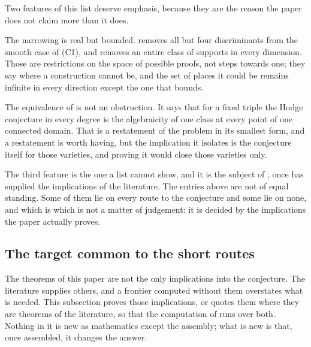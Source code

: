 \begin{remark}\label{rem:remaindershape}
Two features of this list deserve emphasis, because they are the reason the
paper does not claim more than it does.

The narrowing is real but bounded.  removes all
but four discriminants from the smooth case of (C1), and
 removes an entire class of supports in every
dimension. Those are restrictions on the space of possible proofs, not steps
towards one; they say where a construction cannot be, and the set of places it
could be remains infinite in every direction except the one that
 bounds.

The equivalence of  is not an obstruction. It says that
for a fixed triple the Hodge conjecture in every degree is the algebraicity of
one class at every point of one connected domain. That is a restatement of the
problem in its smallest form, and a restatement is worth having, but the
implication it isolates is the conjecture itself for those varieties, and
proving it would close those varieties only.

The third feature is the one a list cannot show, and it is the subject of
, once  has supplied the implications
of the literature. The entries above are not of equal standing. Some of them lie
on every route to the conjecture and some lie on none, and which is which is
not a matter of judgement: it is decided by the implications the paper
actually proves.
\end{remark}

\subsection{The target common to the short routes}\label{ssec:bullseye}

The theorems of this paper are not the only implications into the
conjecture. The literature supplies others, and a frontier computed without
them overstates what is needed. This subsection proves those implications, or
quotes them where they are theorems of the literature, so that the
computation of  runs over both. Nothing in it is new as
mathematics except the assembly; what is new is that, once assembled, it
changes the answer.

